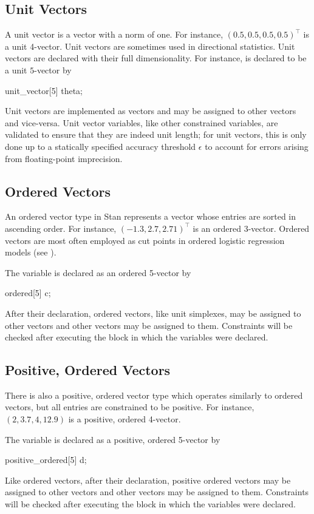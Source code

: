 \subsection{Unit Vectors}

A unit vector is a vector with a norm of one.  For instance,
$(0.5,0.5,0.5,0.5)^{\top}$ is a unit 4-vector.
Unit vectors are sometimes used in directional statistics.
Unit vectors are declared with their full
dimensionality.  For instance,  is declared to
be a unit $5$-vector by
%
\begin{stancode}
unit_vector[5] theta;
\end{stancode}
%
Unit vectors are implemented as vectors and may be assigned to other
vectors and vice-versa.  Unit vector variables, like other constrained
variables, are validated to ensure that they are indeed unit length; for
unit vectors, this is only done up to a statically specified accuracy
threshold $\epsilon$ to account for errors arising from floating-point
imprecision.

\subsection{Ordered Vectors}

An ordered vector type in Stan represents a vector whose entries are
sorted in ascending order.  For instance, $(-1.3,2.7,2.71)^{\top}$ is
an ordered 3-vector.  Ordered vectors are most often employed as cut
points in ordered logistic regression models (see
).

The variable  is declared as an ordered 5-vector by
%
\begin{stancode}
ordered[5] c;
\end{stancode}
%
After their declaration, ordered vectors, like unit simplexes, may be
assigned to other vectors and other vectors may be assigned to them.
Constraints will be checked after executing the block in which the
variables were declared.


\subsection{Positive, Ordered Vectors}

There is also a positive, ordered vector type which operates similarly
to ordered vectors, but all entries are constrained to be positive.
For instance, $(2,3.7,4,12.9)$ is a positive, ordered 4-vector.

The variable  is declared as a positive, ordered 5-vector by
%
\begin{stancode}
positive_ordered[5] d;
\end{stancode}
%
Like ordered vectors, after their declaration, positive ordered vectors
may be assigned to other vectors and other vectors may be assigned to them.
Constraints will be checked after executing the block in which the
variables were declared.

